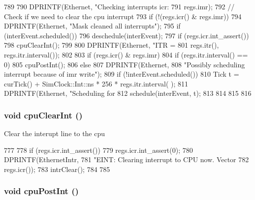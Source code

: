 \begin{DoxyCode}
789 {
790     DPRINTF(Ethernet, "Checking interrupts icr: %
791             regs.imr);
792     // Check if we need to clear the cpu interrupt
793     if (!(regs.icr() & regs.imr)) {
794         DPRINTF(Ethernet, "Mask cleaned all interrupts\n");
795         if (interEvent.scheduled())
796             deschedule(interEvent);
797         if (regs.icr.int_assert())
798             cpuClearInt();
799     }
800     DPRINTF(Ethernet, "ITR = %
801             regs.itr(), regs.itr.interval());
802 
803     if (regs.icr() & regs.imr) {
804         if (regs.itr.interval() == 0)  {
805             cpuPostInt();
806         } else {
807             DPRINTF(Ethernet,
808                     "Possibly scheduling interrupt because of imr write\n");
809             if (!interEvent.scheduled()) {
810                 Tick t = curTick() + SimClock::Int::ns * 256 * regs.itr.interval(
      );
811                 DPRINTF(Ethernet, "Scheduling for %
812                 schedule(interEvent, t);
813             }
814         }
815     }
816 }
\end{DoxyCode}
\hypertarget{classIGbE_a5bb6e41ae1497d53a611db0a6b455115}{
\subsubsection[{cpuClearInt}]{\setlength{\rightskip}{0pt plus 5cm}void cpuClearInt ()}}
\label{classIGbE_a5bb6e41ae1497d53a611db0a6b455115}
Clear the interupt line to the cpu 


\begin{DoxyCode}
777 {
778     if (regs.icr.int_assert()) {
779         regs.icr.int_assert(0);
780         DPRINTF(EthernetIntr,
781                 "EINT: Clearing interrupt to CPU now. Vector %
782                 regs.icr());
783         intrClear();
784     }
785 }
\end{DoxyCode}
\hypertarget{classIGbE_a6cc0f5948b3dc7c1f2e489bce23ef907}{
\subsubsection[{cpuPostInt}]{\setlength{\rightskip}{0pt plus 5cm}void cpuPostInt ()}}
\label{classIGbE_a6cc0f5948b3dc7c1f2e489bce23ef907}



